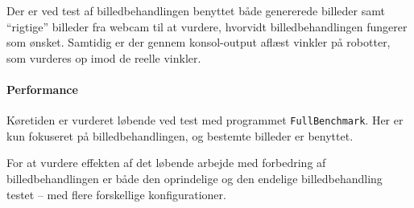 Der er ved test af billedbehandlingen benyttet både genererede billeder samt "`rigtige"' billeder fra webcam til at vurdere, hvorvidt billedbehandlingen fungerer som ønsket. Samtidig er der gennem konsol-output aflæst vinkler på robotter, som vurderes op imod de reelle vinkler.

\paragraph{Performance}
Køretiden er vurderet løbende ved test med programmet \texttt{FullBenchmark}. Her er kun fokuseret på billedbehandlingen, og bestemte billeder er benyttet.

For at vurdere effekten af det løbende arbejde med forbedring af billedbehandlingen er både den oprindelige og den endelige billedbehandling testet -- med flere forskellige konfigurationer.

